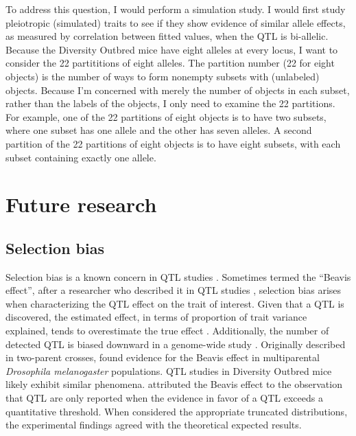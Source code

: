 To address this question, I would perform a simulation study. I would first study pleiotropic (simulated) traits to see if they show evidence of similar allele effects, as measured by correlation between fitted values, when the QTL is bi-allelic. Because the Diversity Outbred mice have eight alleles at every locus, I want to consider the 22 partititions of eight alleles. The partition number (22 for eight objects) is the number of ways to form nonempty subsets with (unlabeled) objects. Because I'm concerned with merely the number of objects in each subset, rather than the labels of the objects, I only need to examine the 22 partitions. For example, one of the 22 partitions of eight objects is to have two subsets, where one subset has one allele and the other has seven alleles. A second partition of the 22 partitions of eight objects is to have eight subsets, with each subset containing exactly one allele.


\section{Future research}


\subsection{Selection bias}

Selection bias is a known concern in QTL studies \citep{lande1990efficiency}. Sometimes termed the ``Beavis effect'', after a researcher who described it in QTL studies \citep{beavis1991quantitative,beavis1994power}, selection bias arises when characterizing the QTL effect on the trait of interest. Given that a QTL is discovered, the estimated effect, in terms of proportion of trait variance explained, tends to overestimate the true effect \citep{broman2009guide}. Additionally, the number of detected QTL is biased downward in a genome-wide study \citep{beavis1998qtl}. Originally described in two-parent crosses, \citet{king2017beavis} found evidence for the Beavis effect in multiparental \emph{Drosophila melanogaster} populations. QTL studies in Diversity Outbred mice likely exhibit similar phenomena. \citet{xu2003theoretical} attributed the Beavis effect to the observation that QTL are only reported when the evidence in favor of a QTL exceeds a quantitative threshold. When \citet{xu2003theoretical} considered the appropriate truncated distributions, the experimental findings agreed with the theoretical expected results. 

